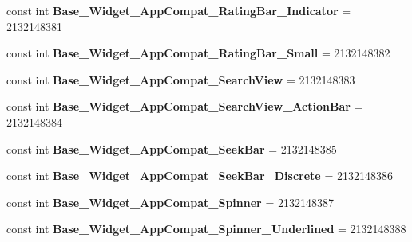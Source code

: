 \begin{DoxyCompactItemize}
\mbox{\label{classst_delivery_1_1_resource_1_1_style_ade7e4cec7bee59213193c0accdb9a5e0}} 
const int {\bfseries Base\+\_\+\+Widget\+\_\+\+App\+Compat\+\_\+\+Rating\+Bar\+\_\+\+Indicator} = 2132148381
\item 
\mbox{\label{classst_delivery_1_1_resource_1_1_style_a2afbbc28c93ea5cfcf76a84be385db25}} 
const int {\bfseries Base\+\_\+\+Widget\+\_\+\+App\+Compat\+\_\+\+Rating\+Bar\+\_\+\+Small} = 2132148382
\item 
\mbox{\label{classst_delivery_1_1_resource_1_1_style_aa5e67c1d529cd09653c0543d1c9557f8}} 
const int {\bfseries Base\+\_\+\+Widget\+\_\+\+App\+Compat\+\_\+\+Search\+View} = 2132148383
\item 
\mbox{\label{classst_delivery_1_1_resource_1_1_style_ab30a6d2ff18d84911193a8f9f792e40c}} 
const int {\bfseries Base\+\_\+\+Widget\+\_\+\+App\+Compat\+\_\+\+Search\+View\+\_\+\+Action\+Bar} = 2132148384
\item 
\mbox{\label{classst_delivery_1_1_resource_1_1_style_a452c6568b0d321924a95c0ae0858724f}} 
const int {\bfseries Base\+\_\+\+Widget\+\_\+\+App\+Compat\+\_\+\+Seek\+Bar} = 2132148385
\item 
\mbox{\label{classst_delivery_1_1_resource_1_1_style_af6c3f8ba84e917fb3c21f19d06a80f25}} 
const int {\bfseries Base\+\_\+\+Widget\+\_\+\+App\+Compat\+\_\+\+Seek\+Bar\+\_\+\+Discrete} = 2132148386
\item 
\mbox{\label{classst_delivery_1_1_resource_1_1_style_a63532d16c1c24eddb66cb2e92a886424}} 
const int {\bfseries Base\+\_\+\+Widget\+\_\+\+App\+Compat\+\_\+\+Spinner} = 2132148387
\item 
\mbox{\label{classst_delivery_1_1_resource_1_1_style_a0f3dad5d5c34bf41df9b6b9722000b4d}} 
const int {\bfseries Base\+\_\+\+Widget\+\_\+\+App\+Compat\+\_\+\+Spinner\+\_\+\+Underlined} = 2132148388
\item 

\end{DoxyCompactItemize}
